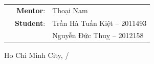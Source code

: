 \documentclass[12pt, a4paper]{article}
\begin{document}
\begin{titlepage}
    \vspace{1cm}
    \begin{table}[H]
        \begin{tabular}{rrl}
        \hspace{5 cm} & \textbf{Mentor}: & Thoại Nam \\
        
        & \textbf{Student}: & Trần Hà Tuấn Kiệt -- 2011493 \\
        & & Nguyễn Đức Thuỵ -- 2012158 \\
        \end{tabular}
        \end{table}
    \vspace{1cm}

    \begin{center}
        {\large Ho Chi Minh City, \the\month/\the\year}
    \end{center}
\end{titlepage}


\newpage
\end{document}
